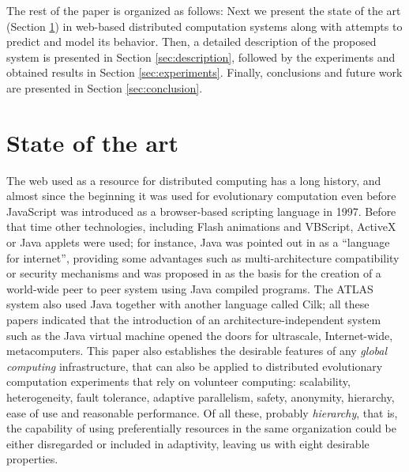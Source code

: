 \documentclass[journal,onecolumn]{IEEEtran}
\begin{document}
The rest of the paper is organized as follows: Next we present the
state of the art (Section \ref{sec:soa}) in web-based distributed 
computation systems along with attempts to predict and model its behavior. %
Then, a detailed description of the proposed system is presented 
in Section \ref{sec:description}, followed by the experiments and 
obtained results in Section \ref{sec:experiments}.
Finally, conclusions and future work are presented in Section \ref{sec:conclusion}. 


\section{State of the art}
\label{sec:soa}

The web used as a resource for distributed computing has a
long history, and almost since the beginning it was used for 
evolutionary computation even before JavaScript was
introduced as a browser-based scripting language in 1997. Before that
time other technologies,
 including Flash animations and VBScript, ActiveX or Java applets were
used; for instance, Java was pointed out in \cite{soares1998get} as a ``language for
internet'', providing some advantages such as multi-architecture compatibility or 
security mechanisms and was proposed in \cite{chandy1996world} as the
basis for the creation of a world-wide peer to peer system using Java
compiled programs. The ATLAS system
\cite{Baldeschwieler:1996:TIG:504450.504482} also used Java together
with another language called Cilk; all these papers indicated that
the introduction of an architecture-independent system such as the
Java virtual machine opened the doors for ultrascale, Internet-wide,
metacomputers. This paper also establishes the desirable features of
any {\em global computing} infrastructure, that can also be applied to
distributed evolutionary computation experiments that rely on
volunteer computing: scalability, heterogeneity, fault tolerance,
adaptive parallelism, safety, anonymity, hierarchy, ease of use and
reasonable performance. Of all these, probably {\em hierarchy}, that
is, the capability of using preferentially resources in the same
organization could be either disregarded or included in adaptivity,
leaving us with eight desirable properties. 
\end{document}
